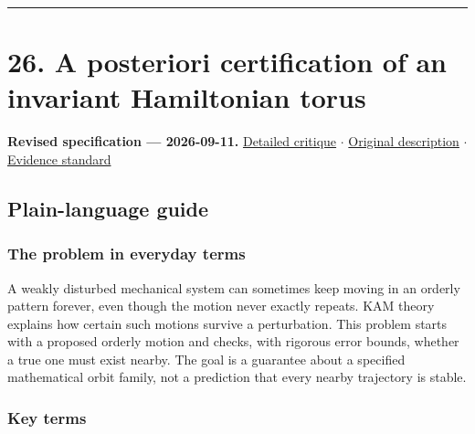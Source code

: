 \documentclass[
  11pt,
]{article}
\begin{document}
\begin{center}\rule{0.5\linewidth}{0.5pt}\end{center}

\section{26. A posteriori certification of an invariant Hamiltonian
torus}

\textbf{Revised specification --- 2026-09-11.}
\href{https://github.com/rick-stevens-ai/Pure-Thought/blob/main/reviews/26-KAM-Theory-Planetary-Stability.md}{Detailed
critique} \ensuremath{\cdot}
\href{https://github.com/rick-stevens-ai/Pure-Thought/blob/main/archive/original-PRDs/26-KAM-Theory-Planetary-Stability.md}{Original
description} \ensuremath{\cdot}
\href{https://github.com/rick-stevens-ai/Pure-Thought/blob/main/reviews/EVIDENCE-STANDARD.md}{Evidence
standard}

\subsection{Plain-language guide}

\subsubsection{The problem in everyday terms}

A weakly disturbed mechanical system can sometimes keep moving in an
orderly pattern forever, even though the motion never exactly repeats.
KAM theory explains how certain such motions survive a perturbation.
This problem starts with a proposed orderly motion and checks, with
rigorous error bounds, whether a true one must exist nearby. The goal is
a guarantee about a specified mathematical orbit family, not a
prediction that every nearby trajectory is stable.

\subsubsection{Key terms}
\end{document}
